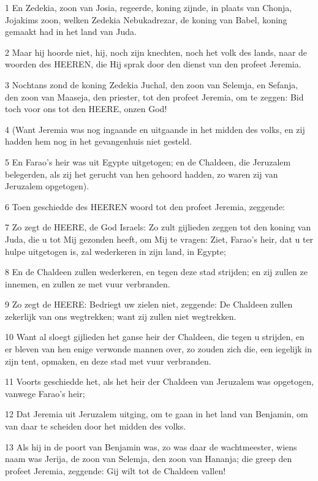 \par 1 En Zedekia, zoon van Josia, regeerde, koning zijnde, in plaats van Chonja, Jojakims zoon, welken Zedekia Nebukadrezar, de koning van Babel, koning gemaakt had in het land van Juda.
\par 2 Maar hij hoorde niet, hij, noch zijn knechten, noch het volk des lands, naar de woorden des HEEREN, die Hij sprak door den dienst van den profeet Jeremia.
\par 3 Nochtans zond de koning Zedekia Juchal, den zoon van Selemja, en Sefanja, den zoon van Maaseja, den priester, tot den profeet Jeremia, om te zeggen: Bid toch voor ons tot den HEERE, onzen God!
\par 4 (Want Jeremia was nog ingaande en uitgaande in het midden des volks, en zij hadden hem nog in het gevangenhuis niet gesteld.
\par 5 En Farao's heir was uit Egypte uitgetogen; en de Chaldeen, die Jeruzalem belegerden, als zij het gerucht van hen gehoord hadden, zo waren zij van Jeruzalem opgetogen).
\par 6 Toen geschiedde des HEEREN woord tot den profeet Jeremia, zeggende:
\par 7 Zo zegt de HEERE, de God Israels: Zo zult gijlieden zeggen tot den koning van Juda, die u tot Mij gezonden heeft, om Mij te vragen: Ziet, Farao's heir, dat u ter hulpe uitgetogen is, zal wederkeren in zijn land, in Egypte;
\par 8 En de Chaldeen zullen wederkeren, en tegen deze stad strijden; en zij zullen ze innemen, en zullen ze met vuur verbranden.
\par 9 Zo zegt de HEERE: Bedriegt uw zielen niet, zeggende: De Chaldeen zullen zekerlijk van ons wegtrekken; want zij zullen niet wegtrekken.
\par 10 Want al sloegt gijlieden het ganse heir der Chaldeen, die tegen u strijden, en er bleven van hen enige verwonde mannen over, zo zouden zich die, een iegelijk in zijn tent, opmaken, en deze stad met vuur verbranden.
\par 11 Voorts geschiedde het, als het heir der Chaldeen van Jeruzalem was opgetogen, vanwege Farao's heir;
\par 12 Dat Jeremia uit Jeruzalem uitging, om te gaan in het land van Benjamin, om van daar te scheiden door het midden des volks.
\par 13 Als hij in de poort van Benjamin was, zo was daar de wachtmeester, wiens naam was Jerija, de zoon van Selemja, den zoon van Hananja; die greep den profeet Jeremia, zeggende: Gij wilt tot de Chaldeen vallen!
